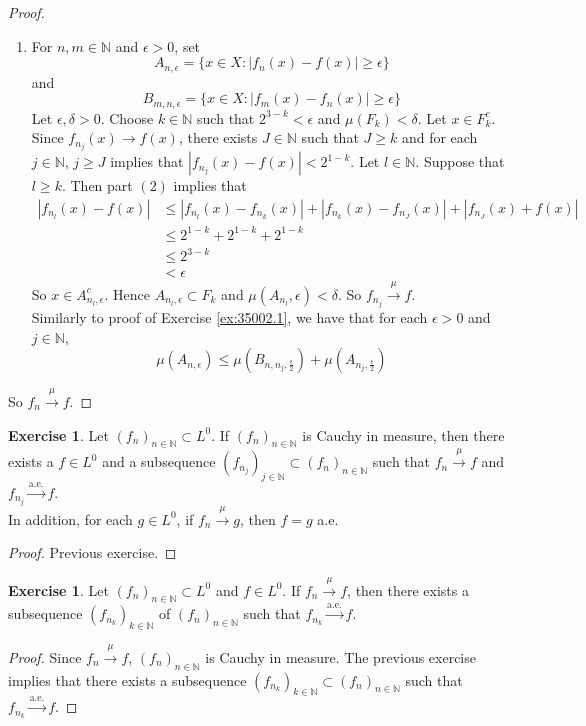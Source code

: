 \documentclass[12pt]{amsart}
\theoremstyle{definition}
\newtheorem{ex}[definition]{Exercise}
\newcommand{\del}{\delta}
\newcommand{\ep}{\epsilon}
\newcommand{\N}{\mathbb{N}}
\newcommand{\convt}[1]{\xrightarrow{\text{#1}}}
\newcommand{\conv}[1]{\xrightarrow{#1}}
\newcommand{\lex}[1]{\label{ex:#1}}
\newcommand{\rex}[1]{Exercise \ref{ex:#1}}
\begin{document}
\begin{proof}
\begin{enumerate}
	\item For $n,m \in \N$ and $\ep >0$, set 
	$$A_{n, \ep} = \{x \in X: |f_n(x) - f(x) |\geq \ep \}$$ 
	and 
	$$B_{m, n, \ep} = \{x \in X: |f_m(x) - f_n(x)| \geq \ep\}$$ 
	Let $\ep, \del>0$. Choose $k \in \N$ such that $2^{3-k} < \ep$ and $\mu(F_k) < \del$. Let $x \in F_k^c$. Since $f_{n_j}(x) \rightarrow f(x)$, there exists $J \in \N$ such that $J \geq k$ and for each $j \in \N$, $j \geq J$ implies that $|f_{n_j}(x) - f(x)| < 2^{1-k}$. Let $l \in \N$. Suppose that $l \geq k$. Then part $(2)$ implies that
	\begin{align*}
	|f_{n_l}(x) - f(x)| 
	& \leq |f_{n_l}(x) - f_{n_k}(x)| + |f_{n_k}(x) - f_{n_J}(x)| + |f_{n_J}(x) + f(x)| \\
	&\leq 2^{1-k} + 2^{1-k}  + 2^{1-k} \\
	&\leq 2^{3-k} \\
	&< \ep
	\end{align*}
	So $x \in A_{n_l, \ep}^c$. Hence $A_{n_l, \ep} \subset F_k$ and $\mu(A_{n_l}, \ep) < \del$. So $f_{n_j} \conv{\mu} f$. \\
	Similarly to proof of \rex{35002.1}, we have that 
	for each $\ep>0$ and $j \in \N$, 
	$$\mu(A_{n, \ep}) \leq \mu(B_{n, n_j, \frac{\ep}{2}}) + \mu(A_{n_j, \frac{\ep}{2}})$$   
	\end{enumerate}
	So $f_n \conv{\mu} f$. 
	\end{proof}
	
	\begin{ex} \lex{35003.1} 
		Let $(f_n)_{n \in \N} \subset L^0$. If $(f_n)_{n \in \N}$ is Cauchy in measure, then there exists a $f \in L^0$ and a subsequence $(f_{n_j})_{j \in \N} \subset (f_n)_{n \in \N}$ such that $f_n \conv{\mu} f$ and $f_{n_j} \convt{a.e.} f$. \\
		In addition, for each $g \in L^0$, if $f_n \conv{\mu} g$, then $f = g$ a.e.
	\end{ex}
	
	\begin{proof}
	Previous exercise.
	\end{proof}
	
	\begin{ex} \lex{35003.2} 
		Let $(f_n)_{n \in \N} \subset L^0$ and $f \in L^0$. If $f_n \xrightarrow{\mu} f$, then there exists a subsequence $(f_{n_k})_{k \in \N}$ of $(f_n)_{n \in \N}$ such that $f_{n_k} \xrightarrow{\text{a.e.}} f$.
	\end{ex}
	
	\begin{proof}
	Since $f_n \conv{\mu} f$, $(f_n)_{n \in \N}$ is Cauchy in measure. The previous exercise implies that there exists a subsequence $(f_{n_k})_{k \in \N} \subset (f_n)_{n \in \N}$ such that $f_{n_k} \convt{a.e.} f$.
	\end{proof}
	
\end{document}
